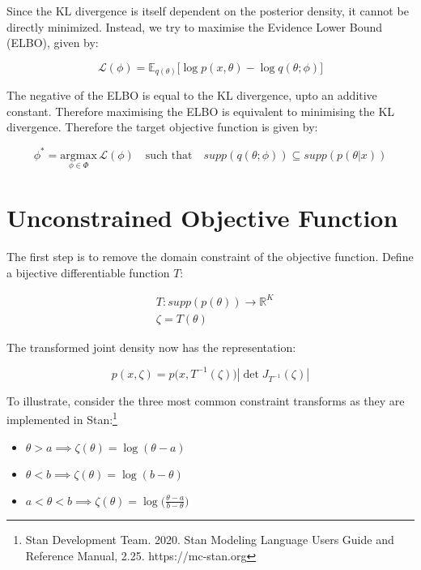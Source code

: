 \documentclass[10pt]{article}
\begin{document}
Since the KL divergence is itself dependent on the posterior density, it cannot be directly minimized. Instead, we try 
to maximise the Evidence Lower Bound (ELBO), given by:

\begin{equation*}
  \mathcal{L}(\phi) = \mathbb{E}_{q(\theta)}\big[\log p(x, \theta) - \log q(\theta;\phi) \big]
\end{equation*}

The negative of the ELBO is equal to the KL divergence, upto an additive constant. Therefore maximising the ELBO is 
equivalent to minimising the KL divergence. Therefore the target objective function is given by:

\begin{equation*}
  \phi^* = \underset{\phi \in \Phi}{\text{argmax}}\, \mathcal{L}(\phi) \quad \text{such that} \quad supp(q(\theta ; \phi)) \subseteq supp(p(\theta | x))
\end{equation*}

\section*{Unconstrained Objective Function}

The first step is to remove the domain constraint of the objective function. Define a bijective differentiable function $T$:

\begin{align*}
  &T : supp(p(\theta)) \to \mathbb{R}^K \\
  &\zeta = T(\theta)
\end{align*}

The transformed joint density now has the representation:

\begin{equation*}
  p(x, \zeta) = p\big(x, T^{-1}(\zeta)\big)|\det J_{T^{-1}}(\zeta)| 
\end{equation*}

To illustrate, consider the three most common constraint transforms as they are implemented in Stan:\footnote{Stan Development Team. 2020. Stan Modeling Language Users Guide and Reference Manual, 2.25. https://mc-stan.org}

\begin{itemize}
  \item $\theta > a \implies \zeta(\theta) = \log(\theta - a)$
  \item $\theta < b \implies \zeta(\theta) = \log(b - \theta)$
  \item $a < \theta < b \implies \zeta(\theta) = \log\big(\frac{\theta - a}{b - \theta}\big)$
\end{itemize}
\end{document}
